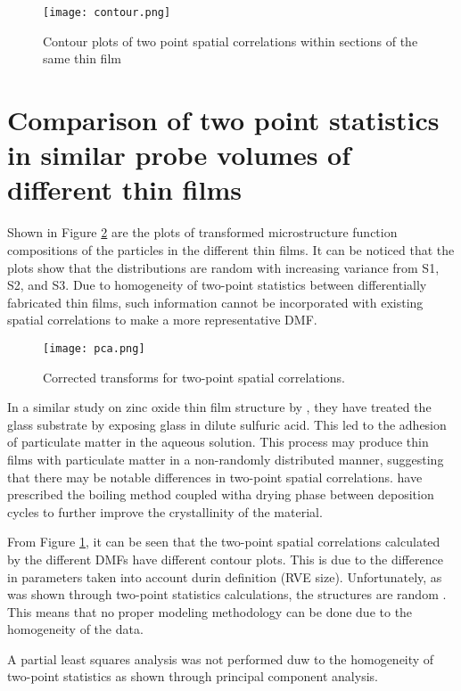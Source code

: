 \begin{figure}
  \centering
  \texttt{[image: contour.png]}
  \caption[Contour plots of spatial correlations]{Contour plots of two point spatial correlations within sections of the same thin film}
  \label{fig:cont}
\end{figure}

\section[Comparison of spatial correlations 2]{Comparison of two point statistics in similar probe volumes of different thin films}

Shown in Figure \ref{fig:pca} are the plots of transformed microstructure function compositions of the particles in the different thin films.
It can be noticed that the plots show that the distributions are random with increasing variance from S1, S2, and S3.
Due to homogeneity of two-point statistics between differentially fabricated thin films, such information cannot be incorporated with existing spatial correlations to make a more representative DMF.

\begin{figure}
  \centering
  \texttt{[image: pca.png]}
  \caption[Transformed spatial correlations]{Corrected transforms for two-point spatial correlations.}
  \label{fig:pca}
\end{figure}

In a similar study on zinc oxide thin film structure by , they have treated the glass substrate by exposing glass in dilute sulfuric acid.
This led to the adhesion of particulate matter in the aqueous solution.
This process may produce thin films with particulate matter in a non-randomly distributed manner, suggesting that there may be notable differences in two-point spatial correlations.
 have prescribed the boiling method coupled witha drying phase between deposition cycles to further improve the crystallinity of the material.

From Figure \ref{fig:cont}, it can be seen that the two-point spatial correlations calculated by the different DMFs have different contour plots.
This is due to the difference in parameters taken into account durin definition (RVE size).
Unfortunately, as was shown through two-point statistics calculations, the structures are random \cite{gupta15}.
This means that no proper modeling methodology can be done due to the homogeneity of the data.

A partial least squares analysis was not performed duw to the homogeneity of two-point statistics as shown through principal component analysis.
